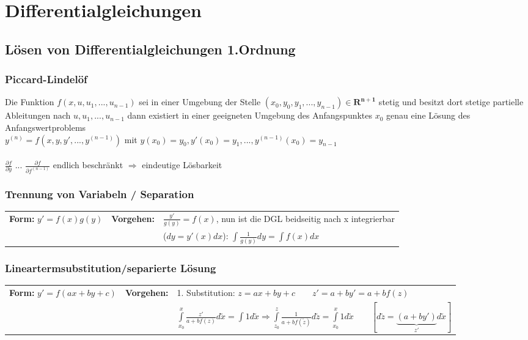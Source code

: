 \newpage
\section{Differentialgleichungen}

\subsection{Lösen von Differentialgleichungen 1.Ordnung}

\subsubsection{Piccard-Lindelöf}
Die Funktion $f(x, u, u_1, ..., u_{n-1})$ sei in einer Umgebung der Stelle $(x_0, y_0, y_1, ..., y_{n-1}) \in \mathbf{R^{n+1}}$ stetig und besitzt dort stetige partielle Ableitungen
nach $u, u_1, ..., u_{n-1}$ dann existiert in einer geeigneten Umgebung des Anfangspunktes $x_0$ genau eine Lösung des Anfangswertproblems\\
$y^{(n)} = f(x, y, y', ...,y^{(n-1)})$ mit $y(x_0) = y_0, y'(x_0) = y_1, ..., y^{(n-1)}(x_0) = y_{n-1}$ \\ \\
$\frac{\partial f}{\partial y}$ ... $\frac{\partial f}{\partial f^{(n-1)}}$ endlich beschränkt $\Rightarrow$ eindeutige Lösbarkeit


\subsubsection{Trennung von Variabeln / Separation }
\begin{tabular}{p{4cm}p{1.5cm}p{10.5cm}}
\textbf{Form:} $y' = f(x) g(y)$ &
\textbf{Vorgehen:}              &
$\frac{y'}{g(y)} = f(x)$, nun ist die DGL beidseitig nach x integrierbar\\  &&
($dy = y'(x) dx$): $\int \frac{1}{g(y)} dy = \int f(x) dx$ 
\end{tabular}

\subsubsection{Lineartermsubstitution/separierte Lösung}
\begin{tabular}{p{4cm}p{1.5cm}p{10.5cm}}
\textbf{Form:} $y'=f(ax+by+c)$   &
\textbf{Vorgehen:}               &
1. Substitution: $z=ax+by+c \qquad z'=a+by' =a+bf(z)$\\ &&
$\int\limits_{x_0}^{x}\frac{z'}{a+bf(z)}d\tilde{x} = \int 1 d\tilde{x} \Rightarrow \int\limits_{z_0}^{z}\frac{1}{a+bf(\tilde{z})}d\tilde{z} = \int\limits_{x_0}^{x}1 d\tilde{x} \qquad [d\tilde{z} = \underbrace{(a+by')}_{z'} d\tilde{x}]$
\end{tabular}

